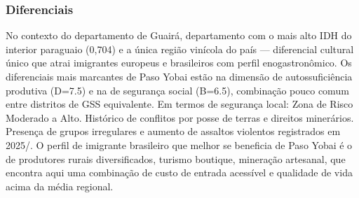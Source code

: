 \subsubsection*{Diferenciais}\label{dif-paso-yobai-0417}
No contexto do departamento de Guairá, departamento com o mais alto IDH do interior paraguaio (0,704) e a única região vinícola do país — diferencial cultural único que atrai imigrantes europeus e brasileiros com perfil enogastronômico. Os diferenciais mais marcantes de Paso Yobai estão na dimensão de autossuficiência produtiva (D=7.5) e na de segurança social (B=6.5), combinação pouco comum entre distritos de GSS equivalente. Em termos de segurança local: Zona de Risco Moderado a Alto. Histórico de conflitos por posse de terras e direitos minerários. Presença de grupos irregulares e aumento de assaltos violentos registrados em 2025/. O perfil de imigrante brasileiro que melhor se beneficia de Paso Yobai é o de produtores rurais diversificados, turismo boutique, mineração artesanal, que encontra aqui uma combinação de custo de entrada acessível e qualidade de vida acima da média regional.
